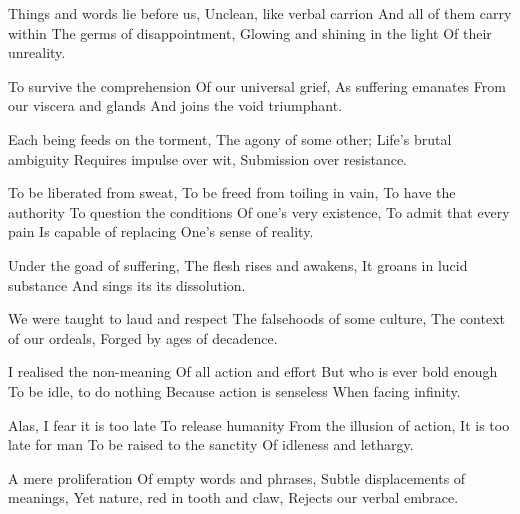 \documentclass{article}
\newenvironment{stanza}{\begin{minipage}{10cm}\begin{internallinenumbers}\obeylines}{\end{internallinenumbers}\end{minipage}\vspace{\baselineskip}}
\begin{document}
\begin{stanza}
Things and words lie before us,
Unclean, like verbal carrion
And all of them carry within
The germs of disappointment,
Glowing and shining in the light
Of their unreality.
\end{stanza}

\begin{stanza}
To survive the comprehension
Of our universal grief,
As suffering emanates
From our viscera and glands
And joins the void triumphant.
\end{stanza}

\begin{stanza}
Each being feeds on the torment,
The agony of some other;
Life's brutal ambiguity
Requires impulse over wit,
Submission over resistance.
\end{stanza}

\begin{stanza}
To be liberated from sweat,
To be freed from toiling in vain,
To have the authority
To question the conditions
Of one's very existence,
To admit that every pain
Is capable of replacing
One's sense of reality.
\end{stanza}

\begin{stanza}
Under the goad of suffering,
The flesh rises and awakens,
It groans in lucid substance
And sings its its dissolution.
\end{stanza}

\begin{stanza}
We were taught to laud and respect
The falsehoods of some culture,
The context of our ordeals,
Forged by ages of decadence.
\end{stanza}

\begin{stanza}
I realised the non-meaning
Of all action and effort
But who is ever bold enough
To be idle, to do nothing
Because action is senseless
When facing infinity.
\end{stanza}

\begin{stanza}
Alas, I fear it is too late
To release humanity
From the illusion of action,
It is too late for man
To be raised to the sanctity
Of idleness and lethargy.
\end{stanza}

\begin{stanza}
A mere proliferation
Of empty words and phrases,
Subtle displacements of meanings,
Yet nature, red in tooth and claw,
Rejects our verbal embrace.
\end{stanza}
\end{document}
